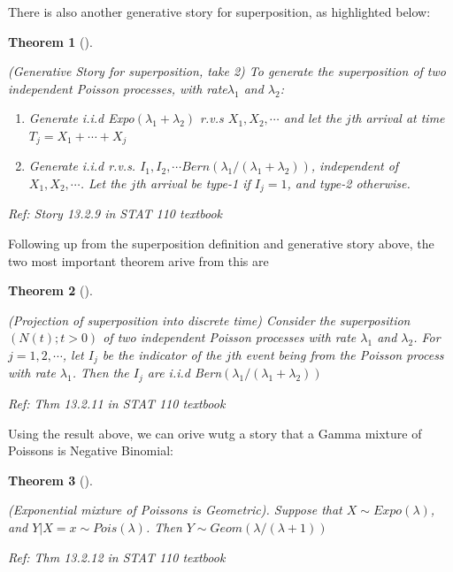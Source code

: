 \documentclass[
  letterpaper,
  DIV=11,
  numbers=noendperiod]{scrreprt}
\theoremstyle{plain}
\newtheorem{theorem}{Theorem}[chapter]
\theoremstyle{definition}
\theoremstyle{remark}
\begin{document}
There is also another generative story for superposition, as highlighted
below:

\leavevmode{}%
\begin{theorem}[]\label{thm-poisson-story-superposition-2}

(Generative Story for superposition, take 2) To generate the
superposition of two independent Poisson processes, with
rate\(\lambda_1\) and \(\lambda_2\):

\begin{enumerate}
\def\labelenumi{\arabic{enumi}.}
\item
  Generate i.i.d Expo\((\lambda_1 +\lambda_2)\) r.v.s
  \(X_1, X_2,\cdots\) and let the \(j\)th arrival at time
  \(T_j =X_1+\cdots+X_j\)
\item
  Generate i.i.d r.v.s.
  \(I_1, I_2, \cdots Bern(\lambda_1/(\lambda_1+\lambda_2))\),
  independent of \(X_1, X_2, \cdots\). Let the \(j\)th arrival be type-1
  if \(I_j=1\), and type-2 otherwise.
\end{enumerate}

\emph{Ref: Story 13.2.9 in STAT 110 textbook}

\end{theorem}

Following up from the superposition definition and generative story
above, the two most important theorem arive from this are

\leavevmode{}%
\begin{theorem}[]\label{thm-superposition-discrete}

(Projection of superposition into discrete time) Consider the
superposition \((N(t);t>0)\) of two independent Poisson processes with
rate \(\lambda_1\) and \(\lambda_2\). For \(j=1,2,\cdots\), let \(I_j\)
be the indicator of the \(j\)th event being from the Poisson process
with rate \(\lambda_1\). Then the \(I_j\) are i.i.d
Bern\((\lambda_1/(\lambda_1+\lambda_2))\)

\emph{Ref: Thm 13.2.11 in STAT 110 textbook}

\end{theorem}

Using the result above, we can orive wutg a story that a Gamma mixture
of Poissons is Negative Binomial:

\leavevmode{}%
\begin{theorem}[]\label{thm-mixture-poisson}

(Exponential mixture of Poissons is Geometric). Suppose that
\(X \sim Expo(\lambda)\), and \(Y|X=x \sim Pois(\lambda)\). Then
\(Y\sim Geom(\lambda/(\lambda+1))\)

\emph{Ref: Thm 13.2.12 in STAT 110 textbook}

\end{theorem}
\end{document}
